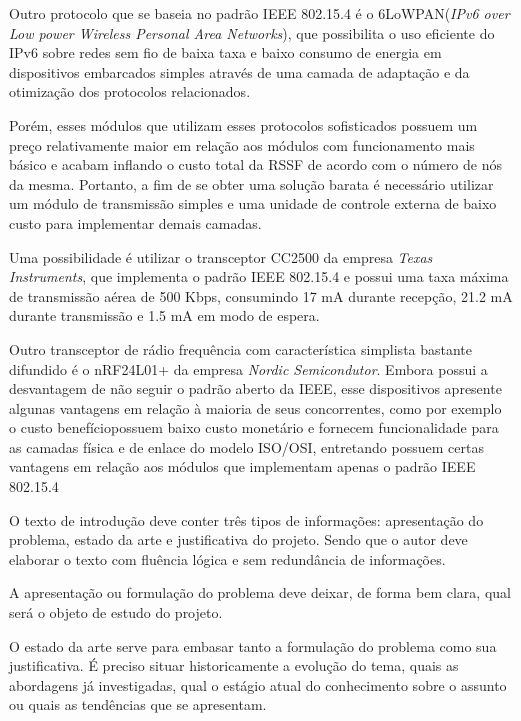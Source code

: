 \documentclass[
    12pt,               %
    a4paper,            %
    english,            %
    brazil,             %
    ]{article}
\begin{document}
Outro protocolo que se baseia no padrão IEEE 802.15.4 é o 6LoWPAN(\textit{IPv6 over Low power Wireless Personal Area Networks}), que possibilita o uso eficiente do IPv6 sobre redes sem fio de baixa taxa e baixo consumo de energia
em dispositivos embarcados simples através de uma camada de adaptação e da otimização dos protocolos relacionados. \cite{shelby_bormann2009}

Porém, esses módulos que utilizam esses protocolos sofisticados possuem um preço relativamente maior em relação aos módulos com funcionamento mais básico e acabam inflando o custo total da RSSF de acordo com o
número de nós da mesma. Portanto, a fim de se obter uma solução barata é necessário utilizar um módulo de transmissão simples e uma unidade de controle externa de baixo custo para implementar demais camadas.

Uma possibilidade é utilizar o transceptor CC2500 da empresa  \textit{Texas Instruments}, que implementa o padrão IEEE 802.15.4 e possui uma taxa máxima de transmissão aérea de 500 Kbps, consumindo 17 mA durante recepção, 21.2 mA durante
transmissão e 1.5 mA em modo de espera. \cite{ccdatasheet}

Outro transceptor de rádio frequência com característica simplista bastante difundido é o nRF24L01+ da empresa \textit{Nordic Semicondutor}. Embora possui a desvantagem de não seguir o padrão aberto da IEEE, esse dispositivos apresente
algunas vantagens em relação à maioria de seus concorrentes, como por exemplo o custo benefíciopossuem baixo custo monetário e fornecem funcionalidade para as camadas física
e de enlace do modelo ISO/OSI, entretando possuem certas vantagens em relação aos módulos que implementam apenas o padrão IEEE 802.15.4







O texto de introdução deve conter três tipos de informações: apresentação do problema, estado da arte e justificativa do projeto.  Sendo que o autor deve elaborar
o texto com fluência lógica e sem redundância de informações.

A apresentação ou formulação do problema deve deixar, de forma bem clara, qual será o objeto de estudo do projeto.

O estado da arte serve para embasar tanto a formulação do problema como sua justificativa. É preciso situar historicamente a evolução do tema,
quais as abordagens já investigadas, qual o estágio atual do conhecimento sobre o assunto ou quais as tendências que se apresentam.
\end{document}

